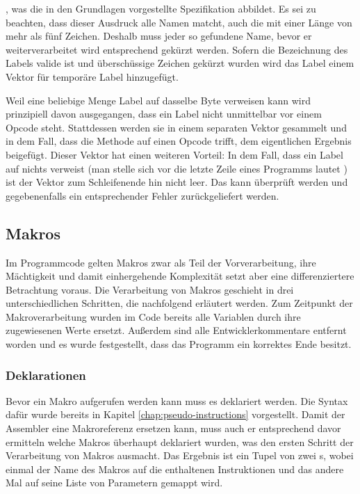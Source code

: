 , was die in den Grundlagen vorgestellte Spezifikation abbildet. Es sei zu beachten, dass dieser Ausdruck alle Namen matcht, auch die mit einer Länge von mehr als fünf Zeichen. Deshalb muss jeder so gefundene Name, bevor er weiterverarbeitet wird entsprechend gekürzt werden. Sofern die Bezeichnung des Labels valide ist und überschüssige Zeichen gekürzt wurden wird das Label einem Vektor für \glqq temporäre\grqq{} Label hinzugefügt.

Weil eine beliebige Menge Label auf dasselbe Byte verweisen kann wird prinzipiell davon ausgegangen, dass ein Label nicht unmittelbar vor einem Opcode steht. Stattdessen werden sie in einem separaten Vektor gesammelt und in dem Fall, dass die Methode auf einen Opcode trifft, dem eigentlichen Ergebnis beigefügt. Dieser Vektor hat einen weiteren Vorteil: In dem Fall, dass ein Label auf nichts verweist (man stelle sich vor die letzte Zeile eines Programms lautet ) ist der Vektor zum Schleifenende hin nicht leer. Das kann überprüft werden und gegebenenfalls ein entsprechender Fehler zurückgeliefert werden.

\subsection{Makros}

Im Programmcode gelten Makros zwar als Teil der Vorverarbeitung, ihre Mächtigkeit und damit einhergehende Komplexität setzt aber eine differenziertere Betrachtung voraus. Die Verarbeitung von Makros geschieht in drei unterschiedlichen Schritten, die nachfolgend erläutert werden. Zum Zeitpunkt der Makroverarbeitung wurden im Code bereits alle Variablen durch ihre zugewiesenen Werte ersetzt. Außerdem sind alle Entwicklerkommentare entfernt worden und es wurde festgestellt, dass das Programm ein korrektes Ende besitzt.

\subsubsection{Deklarationen}

Bevor ein Makro aufgerufen werden kann muss es deklariert werden. Die Syntax dafür wurde bereits in Kapitel \ref{chap:pseudo-instructions} vorgestellt. Damit der Assembler eine Makroreferenz ersetzen kann, muss auch er entsprechend davor ermitteln welche Makros überhaupt deklariert wurden, was den ersten Schritt der Verarbeitung von Makros ausmacht. Das Ergebnis ist ein Tupel von zwei s, wobei einmal der Name des Makros auf die enthaltenen Instruktionen und das andere Mal auf seine Liste von Parametern gemappt wird.

